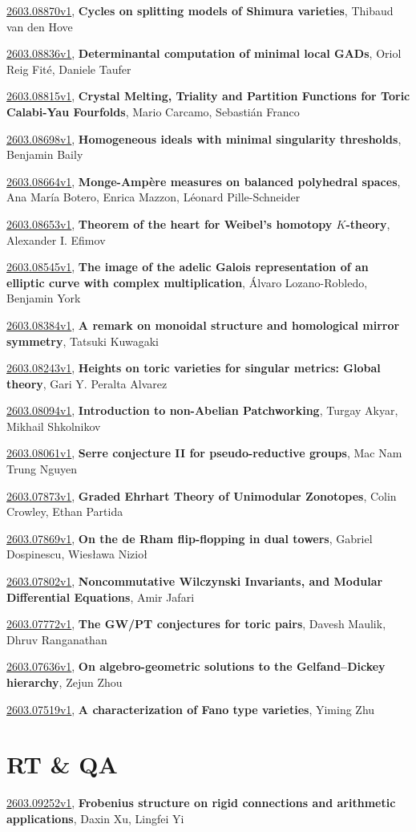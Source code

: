 \documentclass[9pt, a4paper]{article}
\theoremstyle{plain}
\theoremstyle{definition}
\theoremstyle{remark}
\newcommand{\arxiv}[3]{\href{https://arxiv.org/abs/#1}{#1}, \textbf{\textcolor{arxivblue}{#2}}, #3}
\begin{document}
\arxiv{2603.08870v1}{Cycles on splitting models of Shimura varieties}{Thibaud van den Hove}

\arxiv{2603.08836v1}{Determinantal computation of minimal local GADs}{Oriol Reig Fité, Daniele Taufer}

\arxiv{2603.08815v1}{Crystal Melting, Triality and Partition Functions for Toric Calabi-Yau Fourfolds}{Mario Carcamo, Sebastián Franco}

\arxiv{2603.08698v1}{Homogeneous ideals with minimal singularity thresholds}{Benjamin Baily}

\arxiv{2603.08664v1}{Monge-Ampère measures on balanced polyhedral spaces}{Ana María Botero, Enrica Mazzon, Léonard Pille-Schneider}

\arxiv{2603.08653v1}{Theorem of the heart for Weibel's homotopy $K$-theory}{Alexander I. Efimov}

\arxiv{2603.08545v1}{The image of the adelic Galois representation of an elliptic curve with complex multiplication}{Álvaro Lozano-Robledo, Benjamin York}

\arxiv{2603.08384v1}{A remark on monoidal structure and homological mirror symmetry}{Tatsuki Kuwagaki}

\arxiv{2603.08243v1}{Heights on toric varieties for singular metrics: Global theory}{Gari Y. Peralta Alvarez}

\arxiv{2603.08094v1}{Introduction to non-Abelian Patchworking}{Turgay Akyar, Mikhail Shkolnikov}

\arxiv{2603.08061v1}{Serre conjecture II for pseudo-reductive groups}{Mac Nam Trung Nguyen}

\arxiv{2603.07873v1}{Graded Ehrhart Theory of Unimodular Zonotopes}{Colin Crowley, Ethan Partida}

\arxiv{2603.07869v1}{On the de Rham flip-flopping in dual towers}{Gabriel Dospinescu, Wiesława Nizioł}

\arxiv{2603.07802v1}{Noncommutative Wilczynski Invariants, and Modular Differential Equations}{Amir Jafari}

\arxiv{2603.07772v1}{The GW/PT conjectures for toric pairs}{Davesh Maulik, Dhruv Ranganathan}

\arxiv{2603.07636v1}{On algebro-geometric solutions to the Gelfand--Dickey hierarchy}{Zejun Zhou}

\arxiv{2603.07519v1}{A characterization of Fano type varieties}{Yiming Zhu}


\section{RT \& QA}
\arxiv{2603.09252v1}{Frobenius structure on rigid connections and arithmetic applications}{Daxin Xu, Lingfei Yi}
\end{document}
